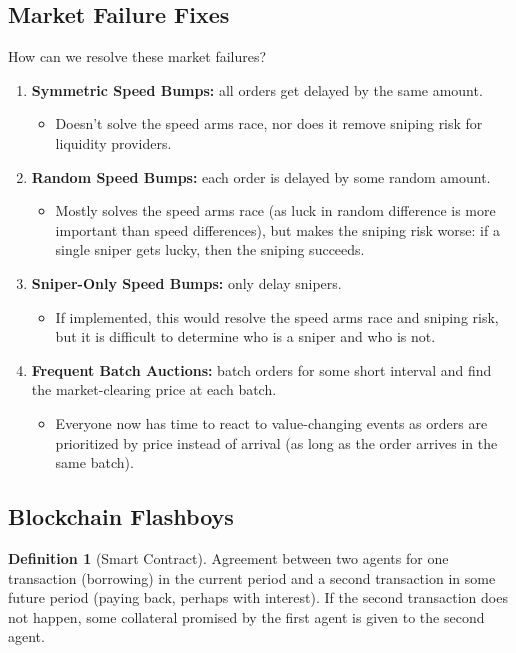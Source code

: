 \documentclass[dvipsnames]{article}
\theoremstyle{definition}
\newtheorem{definition}{Definition}[section]
\theoremstyle{remark}
\begin{document}
\subsection{Market Failure Fixes}

How can we resolve these market failures? 

\begin{enumerate}
	\item \textbf{Symmetric Speed Bumps:} all orders get delayed by the same amount. 
	\begin{itemize}
		\item Doesn't solve the speed arms race, nor does it remove sniping risk for liquidity providers.
	\end{itemize}
	\item \textbf{Random Speed Bumps:} each order is delayed by some random amount.
	\begin{itemize}
		\item Mostly solves the speed arms race (as luck in random difference is more important than speed differences), but makes the sniping risk worse: if a single sniper gets lucky, then the sniping succeeds.
	\end{itemize}
	\item \textbf{Sniper-Only Speed Bumps:} only delay snipers.
	\begin{itemize}
		\item If implemented, this would resolve the speed arms race and sniping risk, but it is difficult to determine who is a sniper and who is not.
	\end{itemize}
	\item \textbf{Frequent Batch Auctions:} batch orders for some short interval and find the market-clearing price at each batch.
	\begin{itemize}
		\item Everyone now has time to react to value-changing events as orders are prioritized by price instead of arrival (as long as the order arrives in the same batch).
	\end{itemize}
\end{enumerate}

\subsection{Blockchain Flashboys}

\begin{definition}[Smart Contract]
	Agreement between two agents for one transaction (borrowing) in the current period and a second transaction in some future period (paying back, perhaps with interest). If the second transaction does not happen, some collateral promised by the first agent is given to the second agent.
\end{definition}
\end{document}
